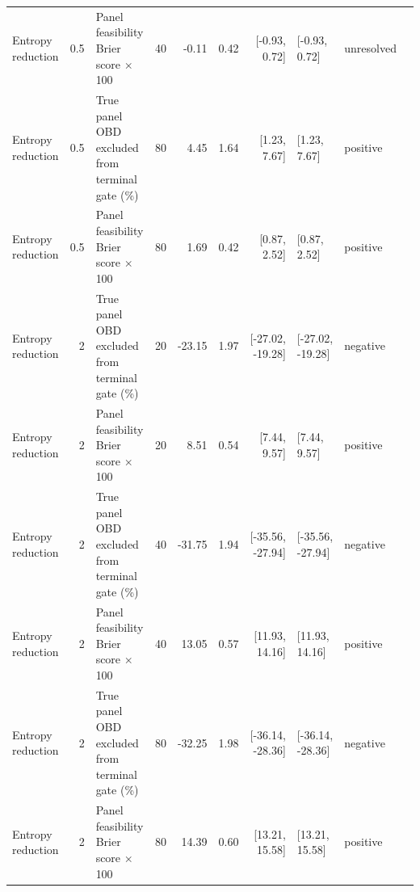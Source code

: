 \begin{longtable}{p{1.9cm}rp{3.1cm}rrrrp{2.7cm}p{2.7cm}p{1.5cm}}
Entropy reduction & 0.5 & Panel feasibility Brier score $\times$100 & 40 & -0.11 & 0.42 & [-0.93, 0.72] & [-0.93, 0.72] & unresolved \\
Entropy reduction & 0.5 & True panel OBD excluded from terminal gate (\%) & 80 & 4.45 & 1.64 & [1.23, 7.67] & [1.23, 7.67] & positive \\
Entropy reduction & 0.5 & Panel feasibility Brier score $\times$100 & 80 & 1.69 & 0.42 & [0.87, 2.52] & [0.87, 2.52] & positive \\
Entropy reduction & 2 & True panel OBD excluded from terminal gate (\%) & 20 & -23.15 & 1.97 & [-27.02, -19.28] & [-27.02, -19.28] & negative \\
Entropy reduction & 2 & Panel feasibility Brier score $\times$100 & 20 & 8.51 & 0.54 & [7.44, 9.57] & [7.44, 9.57] & positive \\
Entropy reduction & 2 & True panel OBD excluded from terminal gate (\%) & 40 & -31.75 & 1.94 & [-35.56, -27.94] & [-35.56, -27.94] & negative \\
Entropy reduction & 2 & Panel feasibility Brier score $\times$100 & 40 & 13.05 & 0.57 & [11.93, 14.16] & [11.93, 14.16] & positive \\
Entropy reduction & 2 & True panel OBD excluded from terminal gate (\%) & 80 & -32.25 & 1.98 & [-36.14, -28.36] & [-36.14, -28.36] & negative \\
Entropy reduction & 2 & Panel feasibility Brier score $\times$100 & 80 & 14.39 & 0.60 & [13.21, 15.58] & [13.21, 15.58] & positive \\
\bottomrule
\end{longtable}
